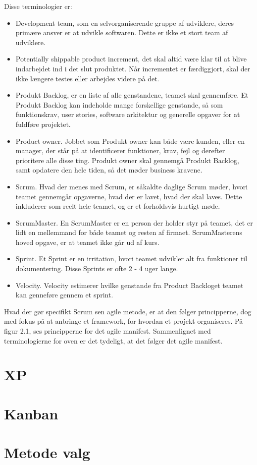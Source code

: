 Disse terminologier er:  
\begin{itemize}
    \item Development team, som en selvorganiserende gruppe af udviklere, deres primære ansver er at udvikle softwaren. Dette er ikke et stort team af udviklere. 
    
    \item Potentially shippable product increment, det skal altid være klar til at blive indarbejdet ind i det slut produktet. Når incrementet er færdiggjort, skal der ikke længere testes eller arbejdes videre på det.
    
    \item Produkt Backlog, er en liste af alle genstandene, teamet skal gennemføre. Et Produkt Backlog kan indeholde mange forskellige genstande, så som funktionskrav, user stories, software arkitektur og generelle opgaver for at fuldføre projektet. 

    
    \item Product owner. Jobbet som Produkt owner kan både være kunden, eller en manager, der står på at identificerer funktioner, krav, fejl og derefter prioritere alle disse ting. Produkt owner skal gennemgå Produkt Backlog, samt opdatere den hele tiden, så det møder business kravene. 
    
    \item Scrum. Hvad der menes med Scrum, er såkaldte daglige Scrum møder, hvori teamet gennemgår opgaverne, hvad der er lavet, hvad der skal laves. Dette inkluderer som reelt hele teamet, og er et forholdsvis hurtigt møde. 
    
    \item ScrumMaster. En ScrumMaster er en person der holder styr på teamet, det er lidt en mellemmand for både teamet og resten af firmaet. ScrumMasterens hoved opgave, er at teamet ikke går ud af kurs. 
    
    \item Sprint. Et Sprint er en irritation, hvori teamet udvikler alt fra funktioner til dokumentering. Disse Sprints er ofte 2 - 4 uger lange. 
    
    \item Velocity. Velocity estimerer hvilke genstande fra Product Backloget teamet kan genneføre gennem et sprint.
\end{itemize}

Hvad der gør specifikt Scrum sen agile metode, er at den følger principperne, dog med fokus på at anbringe et framework, for hvordan et projekt organiseres. På figur 2.1, ses principperne for det agile manifest. Sammenlignet med terminologierne for oven er det tydeligt, at det følger det agile manifest. \cite{Sommerville} 
 

\section{XP}

\section{Kanban}


\section{Metode valg}


 


